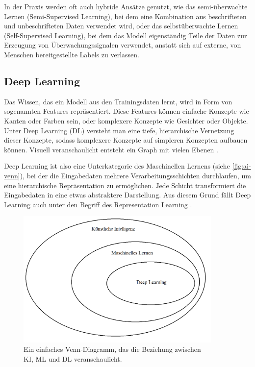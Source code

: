 In der Praxis werden oft auch hybride Ansätze genutzt, wie das semi-überwachte Lernen (Semi-Supervised Learning), bei dem eine Kombination aus beschrifteten und unbeschrifteten Daten verwendet wird, oder das selbstüberwachte Lernen (Self-Supervised Learning), bei dem das Modell eigenständig Teile der Daten zur Erzeugung von Überwachungssignalen verwendet, anstatt sich auf externe, von Menschen bereitgestellte Labels zu verlassen.

\subsection{Deep Learning} \label{subsec:deep-learning}

Das Wissen, das ein Modell aus den Trainingsdaten lernt, wird in Form von sogenannten Features repräsentiert. Diese Features können einfache Konzepte wie Kanten oder Farben sein, oder komplexere Konzepte wie Gesichter oder Objekte. Unter Deep Learning (DL) versteht man eine tiefe, hierarchische Vernetzung dieser Konzepte, sodass komplexere Konzepte auf simpleren Konzepten aufbauen können. Visuell veranschaulicht entsteht ein Graph mit vielen Ebenen \parencite{Goodfellow2016deeplearning}.

Deep Learning ist also eine Unterkategorie des Maschinellen Lernens (siehe \autoref{fig:ai-venn}), bei der die Eingabedaten mehrere Verarbeitungsschichten durchlaufen, um eine hierarchische Repräsentation zu ermöglichen. Jede Schicht transformiert die Eingabedaten in eine etwas abstraktere Darstellung. Aus diesem Grund fällt Deep Learning auch unter den Begriff des Representation Learning \parencite{Zhou2021machinelearning}.

\begin{figure}[t]
	\centering
	\includegraphics[width=0.9\textwidth]{figure_ai_venn-diagram.png}
	\caption{Ein einfaches Venn-Diagramm, das die Beziehung zwischen\\KI, ML und DL veranschaulicht.}
	\label{fig:ai-venn}
\end{figure}

